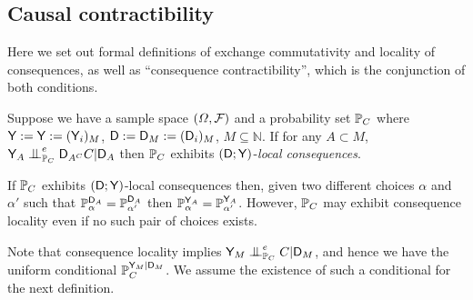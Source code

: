 




\subsection{Causal contractibility}\label{sec:ccontracibility}

Here we set out formal definitions of exchange commutativity and locality of consequences, as well as ``consequence contractibility'', which is the conjunction of both conditions.

\begin{definition}\label{def:caus_cont}
Suppose we have a sample space $(\Omega,\mathcal{F})$ and a probability set $\mathbb{P}_C$  where $\mathsf{Y}:=\mathsf{Y}:=(\mathsf{Y}_i)_{M}$, $\mathsf{D}:=\mathsf{D}_M:=(\mathsf{D}_i)_M$, $M\subseteq \mathbb{N}$. If for any $A\subset M$, $\RV{Y}_A\CI^e_{\prob{P}_C} \RV{D}_{A^C} C |\RV{D}_A$ then $\mathbb{P}_C$ exhibits $(\mathsf{D};\mathsf{Y})$-\emph{local consequences}.
\end{definition}

If $\mathbb{P}_C$ exhibits $(\mathsf{D};\mathsf{Y})$-local consequences then, given two different choices $\alpha$ and $\alpha'$ such that $\mathbb{P}_\alpha^{\mathsf{D}_A}=\mathbb{P}_{\alpha'}^{\mathsf{D}_A}$ then $\mathbb{P}_\alpha^{\mathsf{Y}_A}=\mathbb{P}_{\alpha'}^{\mathsf{Y}_A}$. However, $\mathbb{P}_C$ may exhibit consequence locality even if no such pair of choices exists.

Note that consequence locality implies $\RV{Y}_M \CI^e_{\prob{P}_C} C |\RV{D}_M$, and hence we have the uniform conditional $\mathbb{P}_C^{\mathsf{Y}_M|\mathsf{D}_M}$. We assume the existence of such a conditional for the next definition.

